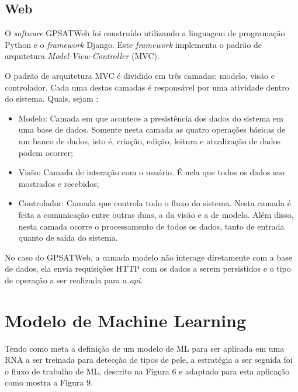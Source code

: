     \subsection{Web}
        O \textit{software} GPSATWeb foi construído utilizando a linguagem de programação Python e o \textit{framework} Django. Este \textit{framework} implementa o padrão de arquitetura \textit{Model-View-Controller} (MVC).

        O padrão de arquitetura MVC é dividido em três camadas: modelo, visão e controlador. Cada uma destas camadas é responsável por uma atividade dentro do sistema. Quais, sejam \cite{Lemos2013}:
            \begin{itemize}
                \item Modelo: Camada em que acontece a presistência dos dados do sistema em uma base de dados. Somente nesta camada as quatro operações básicas de um banco de dados, isto é, criação, edição, leitura e atualização de dados podem ocorrer;
                \item Visão: Camada de interação com o usuário. É nela que todos os dados sao mostrados e recebidos;
                \item Controlador: Camada que controla todo o fluxo do sistema. Nesta camada é feita a comunicação entre outras duas, a da visão e a de modelo. Além disso, nesta camada ocorre o processamento de todos os dados, tanto de entrada quanto de saída do sistema.
            \end{itemize}

        No caso do GPSATWeb, a camada modelo não interage diretamente com a base de dados, ela envia requisições HTTP com os dados a serem persistidos e o tipo de operação a ser realizada para a \textit{api}. 

    


\section{Modelo de Machine Learning}

    Tendo como meta a definição de um modelo de ML para ser aplicada em uma RNA a ser treinada para detecção de tipos de pele, a estratégia a ser seguida foi o fluxo de trabalho de ML, descrito na Figura 6 e adaptado para esta aplicação como mostra a Figura 9.

